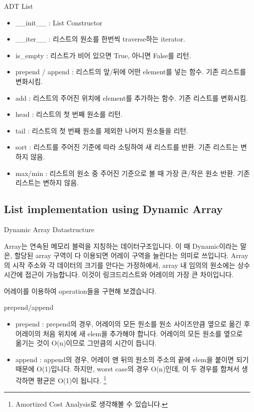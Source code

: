 \documentclass{beamer}
\begin{document}
\begin{frame}[allowframebreaks]{ADT List}
\begin{itemize} 
\item \_\_init\_\_ : List Constructor
\item \_\_iter\_\_ : 리스트의 원소를 한번씩 traverse하는 iterator.
\item is\_empty : 리스트가 비어 있으면 True, 아니면 False를 리턴.
\item prepend / append : 리스트의 앞/뒤에 어떤 element를 넣는 함수. 기존 리스트를 변화시킴. 
\end{itemize}
\framebreak
\begin{itemize}
\item add : 리스트의 주어진 위치에 element를 추가하는 함수. 기존 리스트를 변화시킴. 
\item head : 리스트의 첫 번째 원소를 리턴. 
\item tail : 리스트의 첫 번째 원소를 제외한 나머지 원소들을 리턴. 
\item sort : 리스트를 주어진 기준에 따라 소팅하여 새 리스트를 반환. 기존 리스트는 변하지 않음. 
\item max/min : 리스트의 원소 중 주어진 기준으로 볼 때 가장 큰/작은 원소 반환. 기존 리스트는 변하지 않음. 
\end{itemize}

\end{frame}

\subsection{List implementation using Dynamic Array} 

\begin{frame}{Dynamic Array Datastructure}

Array는 연속된 메모리 블럭을 지칭하는 데이터구조입니다. 이 때 Dynamic이라는 말은, 할당된 array 구역이 다 이용되면 어레이 구역을 늘린다는 의미로 쓰입니다. Array의 시작 주소와 각 데이터의 크기를 안다는 가정하에서, array 내 임의의 원소에는 상수 시간에 접근이 가능합니다. 이것이 링크드리스트와 어레이의 가장 큰 차이입니다. 

어레이를 이용하여 operation들을 구현해 보겠습니다. 
\end{frame}

\begin{frame}{prepend/append}
\begin{itemize}
\item prepend : prepend의 경우, 어레이의 모든 원소를 원소 사이즈만큼 옆으로 옮긴 후 어레이의 처음 위치에 새 elem을 추가해야 합니다. 어레이의 모든 원소를 옆으로 옮기는 것이 O(n)이므로 그만큼의 시간이 듭니다. 
\item append : append의 경우, 어레이 맨 뒤의 원소의 주소의 끝에 elem을 붙이면 되기 때문에 O(1)입니다. 하지만, worst case의 경우 O(n)인데, 이 두 경우를 합쳐서 생각하면 평균은 O(1)이 됩니다. \footnote{Amortized Cost Analysis로 생각해볼 수 있습니다.}
\end{itemize}
\end{frame}
\end{document}
